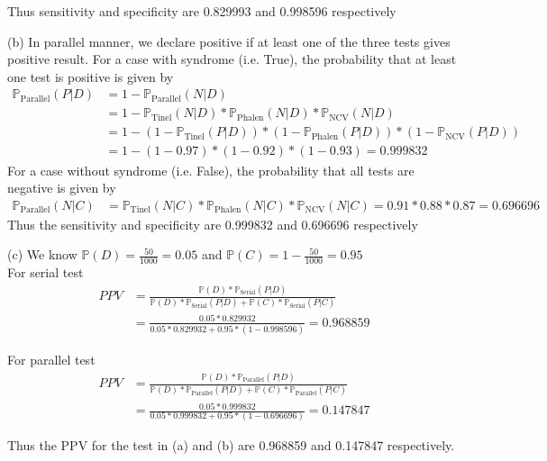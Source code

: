 \documentclass{homeworg}
\begin{document}
Thus sensitivity and specificity are 0.829993 and 0.998596 respectively

(b) In parallel manner, we declare positive if at least one of the three tests gives positive result. For a case with syndrome (i.e. True), the probability that at least one test is positive is given by
\begin{align*}
\mathbb{P}_{\text{Parallel}}(P|D)&=1-\mathbb{P}_{\text{Parallel}}(N|D)\\
&=1-\mathbb{P}_{\text{Tinel}}(N|D)*\mathbb{P}_{\text{Phalen}}(N|D)*\mathbb{P}_{\text{NCV}}(N|D)\\
&=1-(1-\mathbb{P}_{\text{Tinel}}(P|D))*(1-\mathbb{P}_{\text{Phalen}}(P|D))*(1-\mathbb{P}_{\text{NCV}}(P|D))\\
&=1-(1-0.97)*(1-0.92)*(1-0.93)=0.999832
\end{align*}
For a case without syndrome (i.e. False), the probability that all tests are negative is given by 
\begin{align*}
\mathbb{P}_{\text{Parallel}}(N|C)&=\mathbb{P}_{\text{Tinel}}(N|C)*\mathbb{P}_{\text{Phalen}}(N|C)*\mathbb{P}_{\text{NCV}}(N|C)=0.91*0.88*0.87=0.696696
\end{align*}
Thus the sensitivity and specificity are 0.999832 and 0.696696 respectively

(c) We know $\mathbb{P}(D)=\frac{50}{1000}=0.05$ and $\mathbb{P}(C)=1-\frac{50}{1000}=0.95$ \\

For serial test
\begin{align*}
PPV&=\frac{\mathbb{P}(D)*\mathbb{P}_{\text{Serial}}(P|D)}{\mathbb{P}(D)*\mathbb{P}_{\text{Serial}}(P|D)+\mathbb{P}(C)*\mathbb{P}_{\text{Serial}}(P|C)}\\
&=\frac{0.05*0.829932}{0.05*0.829932+0.95*(1-0.998596)}=0.968859
\end{align*}

For parallel test
\begin{align*}
PPV&=\frac{\mathbb{P}(D)*\mathbb{P}_{\text{Parallel}}(P|D)}{\mathbb{P}(D)*\mathbb{P}_{\text{Parallel}}(P|D)+\mathbb{P}(C)*\mathbb{P}_{\text{Parallel}}(P|C)}\\
&=\frac{0.05*0.999832}{0.05*0.999832+0.95*(1-0.696696)}=0.147847
\end{align*}

Thus the PPV for the test in (a) and (b) are 0.968859 and 0.147847 respectively.
\end{document}
